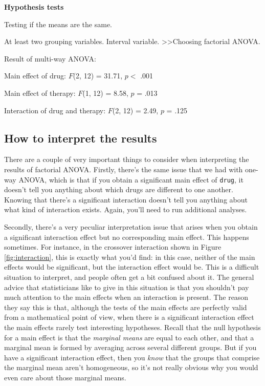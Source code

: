 \documentclass[
]{book}
\theoremstyle{definition}
\theoremstyle{definition}
\theoremstyle{definition}
\theoremstyle{definition}
\theoremstyle{remark}
\begin{document}
\begin{tcolorbox}[colback=white,
  colframe=lightgray,
  coltext=black,
  boxsep=4pt,
  boxrule=0.3pt,
  arc=0pt]
  {   \sffamily
      \color{CSblue}\textbf{Hypothesis tests}
      
      \color{CSgreen}Testing if the means are the same.
      
      At least two grouping variables. Interval variable. \textgreater\textgreater Choosing factorial ANOVA.

      \color{black}
      Result of multi-way ANOVA:

      Main effect of drug: $F$(2, 12) = 31.71, $p <$ .001

      Main effect of therapy: $F$(1, 12) = 8.58, $p$ = .013

      Interaction of drug and therapy: $F$(2, 12) = 2.49, $p$ = .125
      \normalfont
  }
\end{tcolorbox}

\hypertarget{how-to-interpret-the-results}{%
\subsection{How to interpret the results}\label{how-to-interpret-the-results}}

There are a couple of very important things to consider when interpreting the results of factorial ANOVA. Firstly, there's the same issue that we had with one-way ANOVA, which is that if you obtain a significant main effect of \texttt{drug}, it doesn't tell you anything about which drugs are different to one another. Knowing that there's a significant interaction doesn't tell you anything about what kind of interaction exists. Again, you'll need to run additional analyses.

Secondly, there's a very peculiar interpretation issue that arises when you obtain a significant interaction effect but no corresponding main effect. This happens sometimes. For instance, in the crossover interaction shown in Figure \ref{fig:interaction}, this is exactly what you'd find: in this case, neither of the main effects would be significant, but the interaction effect would be. This is a difficult situation to interpret, and people often get a bit confused about it. The general advice that statisticians like to give in this situation is that you shouldn't pay much attention to the main effects when an interaction is present. The reason they say this is that, although the tests of the main effects are perfectly valid from a mathematical point of view, when there is a significant interaction effect the main effects rarely test interesting hypotheses. Recall that the null hypothesis for a main effect is that the \emph{marginal means} are equal to each other, and that a marginal mean is formed by averaging across several different groups. But if you have a significant interaction effect, then you \emph{know} that the groups that comprise the marginal mean aren't homogeneous, so it's not really obvious why you would even care about those marginal means.
\end{document}

